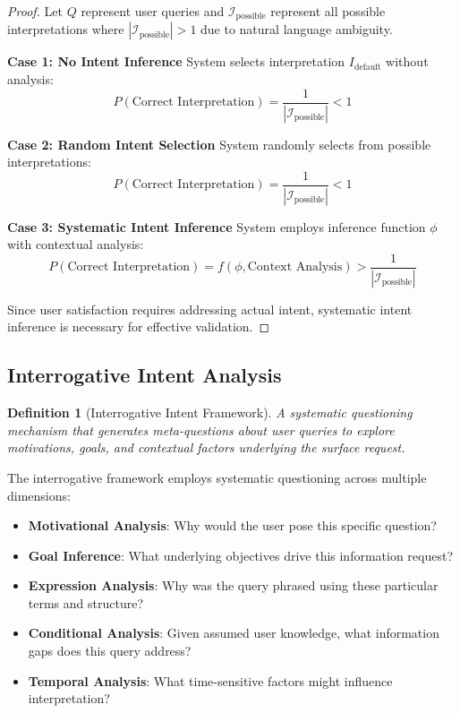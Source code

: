 \documentclass[12pt,a4paper]{article}
\newtheorem{definition}{Definition}
\begin{document}
\begin{proof}
Let $Q$ represent user queries and $\mathcal{I}_{\text{possible}}$ represent all possible interpretations where $|\mathcal{I}_{\text{possible}}| > 1$ due to natural language ambiguity.

\textbf{Case 1: No Intent Inference}
System selects interpretation $I_{\text{default}}$ without analysis:
$$P(\text{Correct Interpretation}) = \frac{1}{|\mathcal{I}_{\text{possible}}|} < 1$$

\textbf{Case 2: Random Intent Selection}
System randomly selects from possible interpretations:
$$P(\text{Correct Interpretation}) = \frac{1}{|\mathcal{I}_{\text{possible}}|} < 1$$

\textbf{Case 3: Systematic Intent Inference}
System employs inference function $\phi$ with contextual analysis:
$$P(\text{Correct Interpretation}) = f(\phi, \text{Context Analysis}) > \frac{1}{|\mathcal{I}_{\text{possible}}|}$$

Since user satisfaction requires addressing actual intent, systematic intent inference is necessary for effective validation.
\end{proof}

\subsection{Interrogative Intent Analysis}

\begin{definition}[Interrogative Intent Framework]
A systematic questioning mechanism that generates meta-questions about user queries to explore motivations, goals, and contextual factors underlying the surface request.
\end{definition}

The interrogative framework employs systematic questioning across multiple dimensions:

\begin{itemize}
\item \textbf{Motivational Analysis}: Why would the user pose this specific question?
\item \textbf{Goal Inference}: What underlying objectives drive this information request?
\item \textbf{Expression Analysis}: Why was the query phrased using these particular terms and structure?
\item \textbf{Conditional Analysis}: Given assumed user knowledge, what information gaps does this query address?
\item \textbf{Temporal Analysis}: What time-sensitive factors might influence interpretation?
\end{itemize}
\end{document}
